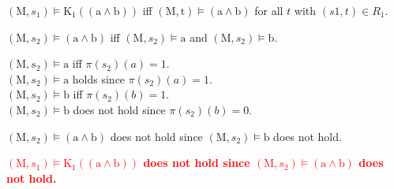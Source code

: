 \documentclass{article}
\newcommand{\emphasise}[1]{\textcolor{RED}{\bf #1}}
\newcommand{\normal}[1]{#1}
\begin{document}
{\fontsize{22}{25}\selectfont 
	\normal{\noindent$\left(\text{M}, s_1 \right) \models  \text{K}_{\text{1}} \left(\left(\text{a}\land\text{b}\right)\right)$ iff $\left(\text{M}, \text{t} \right) \models \left(\text{a}\land\text{b}\right)$ for all $t$ with $(s1, t) \in R_{1}$.}

	\hfill\begin{minipage}{\dimexpr\textwidth-0.1\textwidth}
			\normal{$\left(\text{M}, s_2 \right) \models \left(\text{a}\land\text{b}\right)$ iff $\left(\text{M}, s_2 \right) \models \text{a}$ and $\left(\text{M}, s_2 \right) \models \text{b}$. }

			\hfill\begin{minipage}{\dimexpr\textwidth-0.1\textwidth}
				\normal{$\left(\text{M}, s_2 \right) \models \text{a}$ iff $\pi\left(s_2\right)\left( a \right) = 1$. 
				~\\
	 			$\left(\text{M}, s_2 \right) \models \text{a}$ holds since $\pi\left(s_2\right)\left( a \right) = 1$.}
	 			~\\
 				\normal{$\left(\text{M}, s_2 \right) \models \text{b}$ iff $\pi\left(s_2\right)\left( b \right) = 1$. 
 				~\\
	 			$\left(\text{M}, s_2 \right) \models \text{b}$ does not hold since $\pi\left(s_2\right)\left( b \right) = 0$.}
	 		\end{minipage}
	 	\normal{$\left(\text{M}, s_2 \right) \models \left(\text{a}\land\text{b}\right)$ does not hold since $\left(\text{M}, s_2 \right) \models \text{b}$ does not hold.}
	\end{minipage}

	\emphasise{$\left(\text{M}, s_1 \right) \models  \text{K}_{\text{1}} \left(\left(\text{a}\land\text{b}\right)\right)$ does not hold since $\left(\text{M}, s_2 \right) \models \left(\text{a}\land\text{b}\right)$ does not hold.}
}
\end{document}
